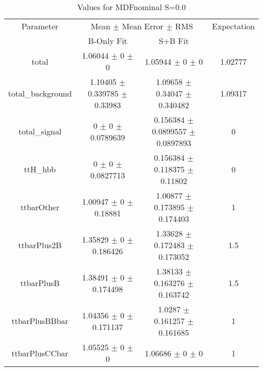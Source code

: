 \begin{table}
\centering
\caption{Values for MDFnominal S=0.0}
\begin{tabular}{cccc}
\toprule
Parameter & \multicolumn{2}{c}{Mean $\pm$ Mean Error $\pm$ RMS} & Expectation\\
 & B-Only Fit & S+B Fit & \\
\midrule
total & \num{1.06044} $\pm$ \num{0} $\pm$ \num{0} & \num{1.05944} $\pm$ \num{0} $\pm$ \num{0} & \num{1.02777}\\
total\_background & \num{1.10405} $\pm$ \num{0.339785} $\pm$ \num{0.33983} & \num{1.09658} $\pm$ \num{0.34047} $\pm$ \num{0.340482} & \num{1.09317}\\
total\_signal & \num{0} $\pm$ \num{0} $\pm$ \num{0.0789639} & \num{0.156384} $\pm$ \num{0.0899557} $\pm$ \num{0.0897893} & \num{0}\\
ttH\_hbb & \num{0} $\pm$ \num{0} $\pm$ \num{0.0827713} & \num{0.156384} $\pm$ \num{0.118375} $\pm$ \num{0.11802} & \num{0}\\
ttbarOther & \num{1.00947} $\pm$ \num{0} $\pm$ \num{0.18881} & \num{1.00877} $\pm$ \num{0.173895} $\pm$ \num{0.174403} & \num{1}\\
ttbarPlus2B & \num{1.35829} $\pm$ \num{0} $\pm$ \num{0.186426} & \num{1.33628} $\pm$ \num{0.172483} $\pm$ \num{0.173052} & \num{1.5}\\
ttbarPlusB & \num{1.38491} $\pm$ \num{0} $\pm$ \num{0.174498} & \num{1.38133} $\pm$ \num{0.163276} $\pm$ \num{0.163742} & \num{1.5}\\
ttbarPlusBBbar & \num{1.04356} $\pm$ \num{0} $\pm$ \num{0.171137} & \num{1.0287} $\pm$ \num{0.161257} $\pm$ \num{0.161685} & \num{1}\\
ttbarPlusCCbar & \num{1.05525} $\pm$ \num{0} $\pm$ \num{0} & \num{1.06686} $\pm$ \num{0} $\pm$ \num{0} & \num{1}\\
\bottomrule
\end{tabular}
\end{table}